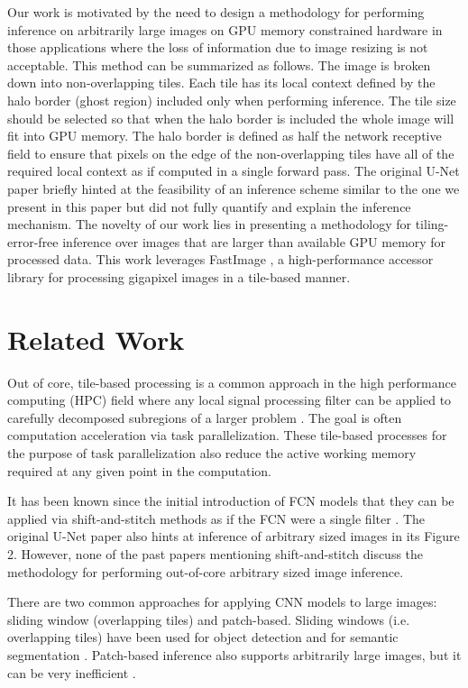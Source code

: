 \documentclass[twoside,11pt]{article}
\begin{document}
Our work is motivated by the need to design a methodology for performing inference on arbitrarily large images on GPU memory constrained hardware in those applications where the loss of information due to image resizing is not acceptable. This method can be summarized as follows. 
The image is broken down into non-overlapping tiles. Each tile has its local context defined by the halo border (ghost region) included only when performing inference. The tile size should be selected so that when the halo border is included the whole image will fit into GPU memory. The halo border is defined as half the network receptive field to ensure that pixels on the edge of the non-overlapping tiles have all of the required local context as if computed in a single forward pass.
The original U-Net paper \citep{Ronneberger2015a} briefly hinted at the feasibility of an inference scheme similar to the one we present in this paper but did not fully quantify and explain the inference mechanism. 
The novelty of our work lies in presenting a methodology for tiling-error-free inference over images that are larger than available GPU memory for processed data. This work leverages FastImage \citep{Bardakoff2019}, a high-performance accessor library for processing gigapixel images in a tile-based manner.

\section{Related Work}
\label{related-work}

Out of core, tile-based processing is a common approach in the high performance computing (HPC) field where any local signal processing filter can be applied to carefully decomposed subregions of a larger problem \citep{Blattner2017}. The goal is often computation acceleration via task parallelization. These tile-based processes for the purpose of task parallelization also reduce the active working memory required at any given point in the computation.

It has been known since the initial introduction of FCN models that they can be applied via shift-and-stitch methods as if the FCN were a single filter \citep{Long2015,Sherrah2016}.
The original U-Net paper \citep{Ronneberger2015a} also hints at inference of arbitrary sized images in its Figure 2. However, none of the past papers mentioning shift-and-stitch discuss the methodology for performing out-of-core arbitrary sized image inference.

There are two common approaches for applying CNN models to large images: sliding window (overlapping tiles) and patch-based. Sliding windows (i.e. overlapping tiles) have been used for object detection \citep{Sermanet2013,VanEtten2019} and for semantic segmentation \citep{Lin2019,Volpi2017a}. Patch-based inference also supports arbitrarily large images, but it can be very inefficient \citep{Volpi2017a,Maggiori2016}.
\end{document}
